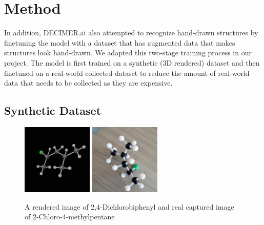\documentclass{article}
\begin{document}
\section{Method}
In addition, DECIMER.ai also attempted to recognize hand-drawn structures by finetuning the model with a dataset that has augmented data that makes structures look hand-drawn. \autocite{decimer} We adapted this two-stage training process in our project. The model is first trained on a synthetic (3D rendered) dataset and then finetuned on a real-world collected dataset to reduce the amount of real-world data that needs to be collected as they are expensive.  
\subsection{Synthetic Dataset}
\begin{figure}
    \centering
    \includegraphics[width=0.3\textwidth]{generated}
    \includegraphics[width=0.3\textwidth]{cap}
    \caption{A rendered image of 2,4-Dichlorobiphenyl and real captured image of 2-Chloro-4-methylpentane}
    \label{fig:example}
\end{figure}
\end{document}
